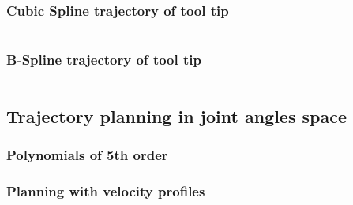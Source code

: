 \begin{frame}
\frametitle{Cubic Spline trajectory of tool tip}

\begin{columns}

\end{columns}
\end{frame}

\begin{frame}
\frametitle{B-Spline trajectory of tool tip}

\begin{columns}

\end{columns}
\end{frame}

\subsection{Trajectory planning in joint angles space}

\begin{frame}
\frametitle{Polynomials of 5th order}
\end{frame}

\begin{frame}
\frametitle{Planning with velocity profiles}
\end{frame}
